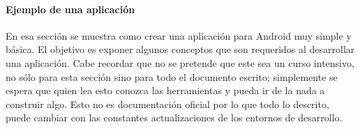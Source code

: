 %
%
%
%
%
%
%

\paragraph{Ejemplo de una aplicación}
\label{\detokenize{dev_docs:una-primera-aplicacion}}
En esa sección se muestra como crear una aplicación para Android muy simple
y básica. El objetivo es exponer algunos conceptos que son requeridos al
desarrollar una aplicación. Cabe recordar que no se pretende que este sea un
curso intensivo, no sólo para esta sección sino para todo el documento escrito;
simplemente se espera que quien lea esto conozca las herramientas y pueda ir
de la nada a construir algo. Esto no es documentación oficial por lo que todo
lo descrito, puede cambiar con las constantes actualizaciones de los entornos
de desarrollo.

